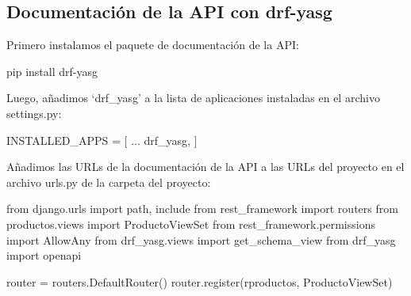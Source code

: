 \documentclass[
  a4paper,
  DIV=11,
  numbers=noendperiod,
  onepage,
  openany]{scrreprt}
\newenvironment{Shaded}{\begin{snugshade}}{\end{snugshade}}
\newcommand{\ExtensionTok}[1]{\textcolor[rgb]{0.00,0.23,0.31}{#1}}
\newcommand{\ImportTok}[1]{\textcolor[rgb]{0.00,0.46,0.62}{#1}}
\newcommand{\NormalTok}[1]{\textcolor[rgb]{0.00,0.23,0.31}{#1}}
\newcommand{\OperatorTok}[1]{\textcolor[rgb]{0.37,0.37,0.37}{#1}}
\newcommand{\StringTok}[1]{\textcolor[rgb]{0.13,0.47,0.30}{#1}}
\newcommand{\VerbatimStringTok}[1]{\textcolor[rgb]{0.13,0.47,0.30}{#1}}
\begin{document}
\begin{tcolorbox}
\chapter{Documentación de la API con
drf-yasg}\label{documentaciuxf3n-de-la-api-con-drf-yasg}

Primero instalamos el paquete de documentación de la API:

\begin{Shaded}
\begin{Highlighting}[]
\ExtensionTok{pip}\NormalTok{ install drf{-}yasg}
\end{Highlighting}
\end{Shaded}

Luego, añadimos `drf\_yasg' a la lista de aplicaciones instaladas en el
archivo settings.py:

\begin{Shaded}
\begin{Highlighting}[]
\NormalTok{INSTALLED\_APPS }\OperatorTok{=}\NormalTok{ [}
\NormalTok{    ...}
    \StringTok{\textquotesingle{}drf\_yasg\textquotesingle{}}\NormalTok{,}
\NormalTok{]}
\end{Highlighting}
\end{Shaded}

Añadimos las URLs de la documentación de la API a las URLs del proyecto
en el archivo urls.py de la carpeta del proyecto:

\begin{Shaded}
\begin{Highlighting}[]
\ImportTok{from}\NormalTok{ django.urls }\ImportTok{import}\NormalTok{ path, include}
\ImportTok{from}\NormalTok{ rest\_framework }\ImportTok{import}\NormalTok{ routers}
\ImportTok{from}\NormalTok{ productos.views }\ImportTok{import}\NormalTok{ ProductoViewSet}
\ImportTok{from}\NormalTok{ rest\_framework.permissions }\ImportTok{import}\NormalTok{ AllowAny}
\ImportTok{from}\NormalTok{ drf\_yasg.views }\ImportTok{import}\NormalTok{ get\_schema\_view}
\ImportTok{from}\NormalTok{ drf\_yasg }\ImportTok{import}\NormalTok{ openapi}

\NormalTok{router }\OperatorTok{=}\NormalTok{ routers.DefaultRouter()}
\NormalTok{router.register(}\VerbatimStringTok{r\textquotesingle{}productos\textquotesingle{}}\NormalTok{, ProductoViewSet)}


\end{Highlighting}
\end{Shaded}
\end{tcolorbox}
\end{document}
